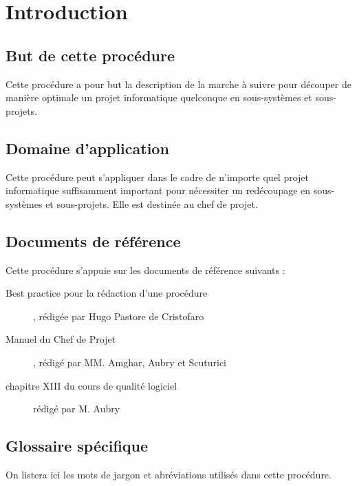 \section{Introduction}

\subsection{But de cette procédure}

Cette procédure a pour but la description de la marche à suivre pour
découper de manière optimale un projet informatique quelconque en
sous-systèmes et sous-projets.


\subsection{Domaine d'application}

Cette procédure peut s'appliquer dans le cadre de n'importe quel projet
informatique suffisamment important pour nécessiter un redécoupage en
sous-systèmes et sous-projets. Elle est destinée au chef de projet.


\subsection{Documents de référence}

Cette procédure s'appuie sur les documents de référence suivants :

\begin{description}

\item[Best practice pour la rédaction d'une procédure], rédigée par Hugo
Pastore de Cristofaro
\item[Manuel du Chef de Projet], rédigé par MM. Amghar, Aubry et Scuturici 
\item[chapitre XIII du cours de qualité logiciel] rédigé par M. Aubry 
\end{description}


\subsection{Glossaire spécifique}

On listera ici les mots de jargon et abréviations utilisés dans cette
procédure.
